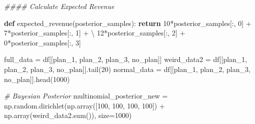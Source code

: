 \documentclass[]{tufte-book}
\newenvironment{Shaded}{}{}
\newcommand{\BuiltInTok}[1]{#1}
\newcommand{\CommentTok}[1]{\textcolor[rgb]{0.38,0.63,0.69}{\textit{#1}}}
\newcommand{\ControlFlowTok}[1]{\textcolor[rgb]{0.00,0.44,0.13}{\textbf{#1}}}
\newcommand{\DecValTok}[1]{\textcolor[rgb]{0.25,0.63,0.44}{#1}}
\newcommand{\KeywordTok}[1]{\textcolor[rgb]{0.00,0.44,0.13}{\textbf{#1}}}
\newcommand{\NormalTok}[1]{#1}
\newcommand{\OperatorTok}[1]{\textcolor[rgb]{0.40,0.40,0.40}{#1}}
\newcommand{\StringTok}[1]{\textcolor[rgb]{0.25,0.44,0.63}{#1}}
\theoremstyle{definition}
\theoremstyle{definition}
\theoremstyle{definition}
\theoremstyle{remark}
\begin{document}
\begin{Shaded}
\begin{Highlighting}[]
\CommentTok{\#\#\#\# Calculate Expected Revenue}

\KeywordTok{def}\NormalTok{ expected\_revenue(posterior\_samples):}
    \ControlFlowTok{return} \DecValTok{10}\OperatorTok{*}\NormalTok{posterior\_samples[:, }\DecValTok{0}\NormalTok{] }\OperatorTok{+} \DecValTok{7}\OperatorTok{*}\NormalTok{posterior\_samples[:, }\DecValTok{1}\NormalTok{] }\OperatorTok{+} \OperatorTok{\textbackslash{}}
           \DecValTok{12}\OperatorTok{*}\NormalTok{posterior\_samples[:, }\DecValTok{2}\NormalTok{] }\OperatorTok{+} \DecValTok{0}\OperatorTok{*}\NormalTok{posterior\_samples[:, }\DecValTok{3}\NormalTok{]}

\NormalTok{full\_data }\OperatorTok{=}\NormalTok{ df[[}\StringTok{\textquotesingle{}plan\_1\textquotesingle{}}\NormalTok{, }\StringTok{\textquotesingle{}plan\_2\textquotesingle{}}\NormalTok{, }\StringTok{\textquotesingle{}plan\_3\textquotesingle{}}\NormalTok{, }\StringTok{\textquotesingle{}no\_plan\textquotesingle{}}\NormalTok{]]}
\NormalTok{weird\_data2 }\OperatorTok{=}\NormalTok{ df[[}\StringTok{\textquotesingle{}plan\_1\textquotesingle{}}\NormalTok{, }\StringTok{\textquotesingle{}plan\_2\textquotesingle{}}\NormalTok{, }\StringTok{\textquotesingle{}plan\_3\textquotesingle{}}\NormalTok{, }\StringTok{\textquotesingle{}no\_plan\textquotesingle{}}\NormalTok{]].tail(}\DecValTok{20}\NormalTok{)}
\NormalTok{normal\_data }\OperatorTok{=}\NormalTok{ df[[}\StringTok{\textquotesingle{}plan\_1\textquotesingle{}}\NormalTok{, }\StringTok{\textquotesingle{}plan\_2\textquotesingle{}}\NormalTok{, }\StringTok{\textquotesingle{}plan\_3\textquotesingle{}}\NormalTok{, }\StringTok{\textquotesingle{}no\_plan\textquotesingle{}}\NormalTok{]].head(}\DecValTok{1000}\NormalTok{)}

\CommentTok{\# Bayesian Posterior}
\NormalTok{multinomial\_posterior\_new }\OperatorTok{=}\NormalTok{ np.random.dirichlet(np.array([}\DecValTok{100}\NormalTok{, }
\DecValTok{100}\NormalTok{, }\DecValTok{100}\NormalTok{, }\DecValTok{100}\NormalTok{]) }\OperatorTok{+}\NormalTok{ np.array(weird\_data2.}\BuiltInTok{sum}\NormalTok{()), size}\OperatorTok{=}\DecValTok{1000}\NormalTok{)}


\end{Highlighting}
\end{Shaded}
\end{document}
